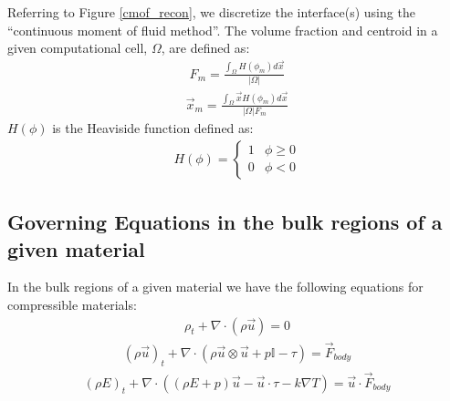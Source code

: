 \documentclass[]{article}
\newcommand{\EyeTen}{\mathbb{I}}
\begin{document}
Referring to Figure \ref{cmof_recon}, we discretize the interface(s)
using the ``continuous moment of fluid method''\cite{ye2024improved}.
The volume fraction and centroid in a given computational cell, $\Omega$,
are defined as:
\begin{eqnarray}
F_{m}=\frac{\int_{\Omega} H(\phi_{m})d\vec{x}}{|\Omega|}
\end{eqnarray}
\begin{eqnarray}
\vec{x}_{m}=\frac{\int_{\Omega} \vec{x}H(\phi_{m})d\vec{x}}{|\Omega|F_{m}}
\end{eqnarray}
$H(\phi)$ is the Heaviside function defined as:
\begin{eqnarray}
	H(\phi)=\left\{ \begin{array}{cc}
		1 & \phi\ge 0 \\
		0 & \phi<0 
	\end{array} \right.
\end{eqnarray}

\subsection{Governing Equations in the bulk regions of a given material }

In the bulk regions of a given material we have the following
equations for compressible materials\cite{jemison2014compressible}:
\begin{eqnarray}
	\rho_{t}+\nabla\cdot(\rho\vec{u})=0
\end{eqnarray}
\begin{eqnarray}
	(\rho\vec{u})_{t}+\nabla\cdot(
	\rho\vec{u}\otimes\vec{u}+p\EyeTen-\tau)=\vec{F}_{body}
\end{eqnarray}
\begin{eqnarray}
	(\rho E)_{t}+\nabla\cdot(
	(\rho E + p)\vec{u}-\vec{u}\cdot\tau-k\nabla T)=
	\vec{u}\cdot \vec{F}_{body}
	\label{energy}
\end{eqnarray}

\end{document}
